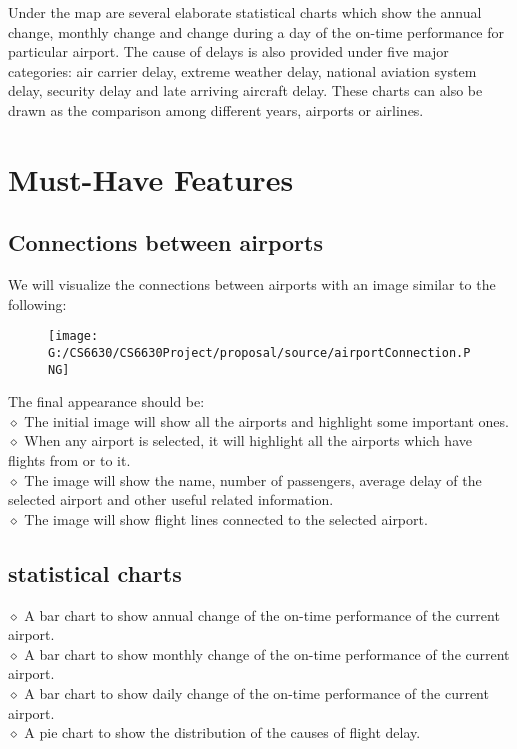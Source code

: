 \documentclass[12pt]{article}
\begin{document}
Under the map are several elaborate statistical charts which show the annual change, monthly change and change during a day of the on-time performance for particular airport. The cause of delays is also provided under five major categories: air carrier delay, extreme weather delay, national aviation system delay, security delay and late arriving aircraft delay. These charts can also be drawn as the comparison among different years, airports or airlines.

\section{Must-Have Features}
    \subsection{Connections between airports}
    We will visualize the connections between airports with an image similar to the following:
    \begin{figure}[H]
      \centering
      \texttt{[image: G:/CS6630/CS6630Project/proposal/source/airportConnection.PNG]}
    \end{figure}
    \noindent The final appearance should be:\\
    $\diamond$ The initial image will show all the airports and highlight some important ones.\\
    $\diamond$ When any airport is selected, it will highlight all the airports which have flights from or to it.\\
    $\diamond$ The image will show the name, number of passengers, average delay of the selected airport and other useful related information.\\
    $\diamond$ The image will show flight lines connected to the selected airport.

    \subsection{statistical charts}
    \noindent $\diamond$ A bar chart to show annual change of the on-time performance of the current airport.\\
    $\diamond$ A bar chart to show monthly change of the on-time performance of the current airport.\\
    $\diamond$ A bar chart to show daily change of the on-time performance of the current airport.\\
    $\diamond$ A pie chart to show the distribution of the causes of flight delay.\\
\end{document}

